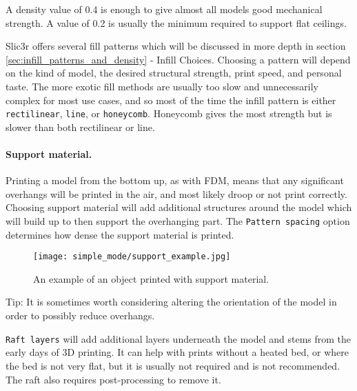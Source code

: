 A density value of 0.4 is enough to give almost all models good mechanical strength.  A value of 0.2 is usually the minimum required to support flat ceilings.

Slic3r offers several fill patterns which will be discussed in more depth in section \ref{sec:infill_patterns_and_density} - Infill Choices.  Choosing a pattern will depend on the kind of model, the desired structural  strength, print speed, and personal taste.  The more exotic fill methods are usually too slow and unnecessarily complex for most use cases, and so most of the time the infill pattern is either \texttt{rectilinear}, \texttt{line}, or \texttt{honeycomb}.  Honeycomb gives the most strength but is slower than both rectilinear or line.


\paragraph{Support material.} %
\label{par:simple_support_material}
Printing a model from the bottom up, as with FDM, means that any significant overhangs will be printed in the air, and most likely droop or not print correctly.  Choosing support material will add additional structures around the model which will build up to then support the overhanging part.  The \texttt{Pattern spacing} option determines how dense the support material is printed.

\begin{figure}[H]
\centering
\texttt{[image: simple\_mode/support\_example.jpg]}
\caption{An example of an object printed with support material.}
\label{fig:support_example}
\end{figure}

Tip: It is sometimes worth considering altering the orientation of the model in order to possibly reduce overhangs.

\texttt{Raft layers} will add additional layers underneath the model and stems from the early days of 3D printing.  It can help with prints without a heated bed, or where the bed is not very flat, but it is usually not required and is not recommended.  The raft also requires post-processing to remove it.

